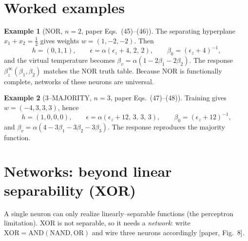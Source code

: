 \documentclass[11pt,a4paper]{article}
\theoremstyle{definition}
\newtheorem{example}{Example}[section]
\theoremstyle{remark}
\begin{document}
\section{Worked examples}
\label{sec:examples}
\begin{example}[NOR, $n=2$, paper Eqs.~(45)--(46)]
The separating hyperplane $x_1+x_2=\tfrac12$ gives weights
$w=(1,-2,-2)$. Then
\begin{equation}
h=(0,1,1),\qquad \epsilon=\alpha(\epsilon_z+4,\,2,\,2),\qquad
\beta_0=(\epsilon_z+4)^{-1},
\end{equation}
and the virtual temperature becomes
$\beta_v=\alpha(1-2\beta_1-2\beta_2)$. The response
$\beta_z^\infty(\beta_1,\beta_2)$ matches the NOR truth table. Because
NOR is functionally complete, networks of these neurons are universal.
\end{example}

\begin{example}[3--MAJORITY, $n=3$, paper Eqs.~(47)--(48)]
Training gives $w=(-4,3,3,3)$, hence
\begin{equation}
h=(1,0,0,0),\qquad \epsilon=\alpha(\epsilon_z+12,\,3,\,3,\,3),\qquad
\beta_0=(\epsilon_z+12)^{-1},
\end{equation}
and $\beta_v=\alpha(4-3\beta_1-3\beta_2-3\beta_3)$. The response
reproduces the majority function.
\end{example}

\section{Networks: beyond linear separability (XOR)}
\label{sec:networks}
A single neuron can only realize linearly--separable functions (the
perceptron limitation). XOR is not separable, so it needs a
\emph{network}: write $\text{XOR}=\text{AND}(\text{NAND},\text{OR})$ and
wire three neurons accordingly [paper, Fig.~8].
\end{document}
